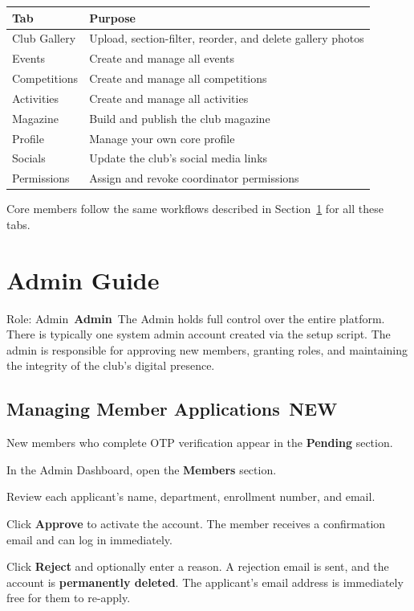 \documentclass[12pt,a4paper]{article}
\newcommand{\rolebadge}[2]{%
  \colorbox{#1}{\color{white}\,\textbf{\footnotesize #2}\,}%
}
\newcommand{\newbadge}{%
  \colorbox{NewFrame}{\color{white}\,\textbf{\footnotesize NEW}\,}%
}
\begin{document}
\begin{center}
\renewcommand{\arraystretch}{1.35}
\begin{tabularx}{\linewidth}{L{3.2cm} X}
\toprule
\textbf{Tab} & \textbf{Purpose} \\
\midrule
Club Gallery & Upload, section-filter, reorder, and delete gallery photos \\
Events & Create and manage all events \\
Competitions & Create and manage all competitions \\
Activities & Create and manage all activities \\
Magazine & Build and publish the club magazine \\
Profile & Manage your own core profile \\
Socials & Update the club's social media links \\
Permissions & Assign and revoke coordinator permissions \\
\bottomrule
\end{tabularx}
\end{center}

Core members follow the same workflows described in Section~\ref{sec:admin} for all these tabs.

\section{Admin Guide}
\label{sec:admin}

\begin{rolebox}[AdminColor]{Role: Admin \rolebadge{AdminColor}{Admin}}
The Admin holds full control over the entire platform. There is typically one system admin account created via the setup script. The admin is responsible for approving new members, granting roles, and maintaining the integrity of the club's digital presence.
\end{rolebox}

\subsection{Managing Member Applications \newbadge}

New members who complete OTP verification appear in the \textbf{Pending} section.

\begin{steps}
\item In the Admin Dashboard, open the \textbf{Members} section.
\item Review each applicant's name, department, enrollment number, and email.
\item Click \textbf{Approve} to activate the account. The member receives a confirmation email and can log in immediately.
\item Click \textbf{Reject} and optionally enter a reason. A rejection email is sent, and the account is \textbf{permanently deleted}. The applicant's email address is immediately free for them to re-apply.
\end{steps}
\end{document}
